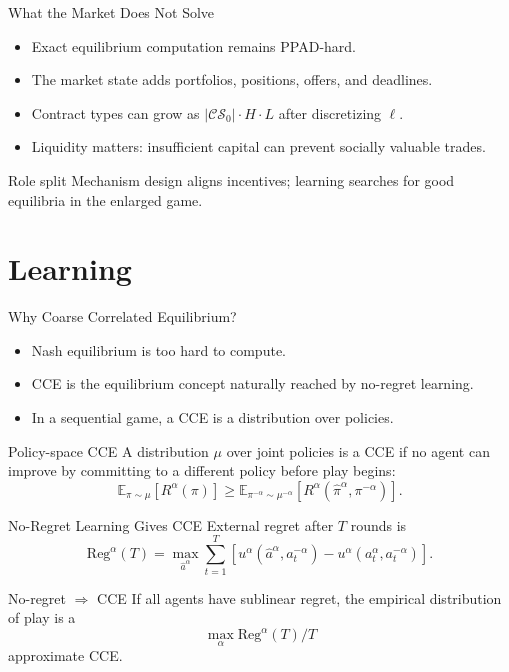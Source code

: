 \documentclass[10pt,aspectratio=169]{beamer}
\begin{document}
\begin{frame}{What the Market Does Not Solve}
\small
\begin{itemize}
  \item Exact equilibrium computation remains PPAD-hard.
  \item The market state adds portfolios, positions, offers, and deadlines.
  \item Contract types can grow as $|\mathcal{CS}_0|\cdot H\cdot L$ after discretizing $\ell$.
  \item Liquidity matters: insufficient capital can prevent socially valuable trades.
\end{itemize}

\begin{block}{Role split}
Mechanism design aligns incentives; learning searches for good equilibria in the enlarged game.
\end{block}
\end{frame}

\section{Learning}

\begin{frame}{Why Coarse Correlated Equilibrium?}
\small
\begin{itemize}
  \item Nash equilibrium is too hard to compute.
  \item CCE is the equilibrium concept naturally reached by no-regret learning.
  \item In a sequential game, a CCE is a distribution over policies.
\end{itemize}

\begin{block}{Policy-space CCE}
A distribution $\mu$ over joint policies is a CCE if no agent can improve by committing to a different policy before play begins:
\[
\mathbb{E}_{\pi\sim\mu}[R^\alpha(\pi)]
\ge
\mathbb{E}_{\pi^{-\alpha}\sim\mu^{-\alpha}}[R^\alpha(\hat\pi^\alpha,\pi^{-\alpha})].
\]
\end{block}
\end{frame}

\begin{frame}{No-Regret Learning Gives CCE}
\small
External regret after $T$ rounds is
\[
\mathrm{Reg}^\alpha(T)=
\max_{\hat a^\alpha}
\sum_{t=1}^T
\left[u^\alpha(\hat a^\alpha,a_t^{-\alpha})
-u^\alpha(a_t^\alpha,a_t^{-\alpha})\right].
\]

\begin{block}{No-regret $\Rightarrow$ CCE}
If all agents have sublinear regret, the empirical distribution of play is a
\[
\max_\alpha \mathrm{Reg}^\alpha(T)/T
\]
approximate CCE.
\end{block}
\end{frame}
\end{document}
